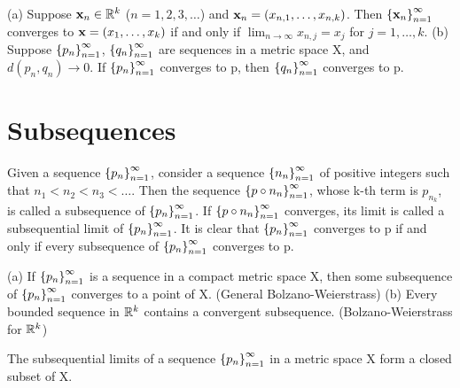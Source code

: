 \begin{theorem} %
  \label{thm:chap3:convergence_components}
  (a) Suppose $\mathbf{x}_n \in \mathbb{R}^k$ ($n=1, 2, 3, \dots$) and
  $\mathbf{x}_n = (x_{n,1}, \dots, x_{n,k})$. Then
  $\left\{ \mathbf{x}_n \right\}_{n=1}^\infty$ converges to $\mathbf{x} = (x_1, \dots, x_k)$
  if and only if $\lim_{n \to \infty} x_{n,j} = x_j$ for $j=1, \dots, k$.
  (b) Suppose $\left\{ p_n \right\}_{n=1}^\infty$, $\left\{ q_n \right\}_{n=1}^\infty$ are sequences in a
  metric space X, and $d(p_n, q_n) \to 0$. If $\left\{ p_n \right\}_{n=1}^\infty$
  converges to p, then $\left\{ q_n \right\}_{n=1}^\infty$ converges to p.
\end{theorem}

\section{Subsequences}
\label{sec:chap3:subsequences}

\begin{definition} %
  \label{def:chap3:subsequence_sublimit}
  Given a sequence $\left\{ p_n \right\}_{n=1}^\infty$, consider a sequence $\left\{ n_n \right\}_{n=1}^\infty$
  of positive integers such that $n_1 < n_2 < n_3 < \dots$. Then the
  sequence $\left\{ p \circ n_n \right\}_{n=1}^\infty$, whose k-th term is $p_{n_k}$, is
  called a subsequence of $\left\{ p_n \right\}_{n=1}^\infty$. If $\left\{ p \circ n_n \right\}_{n=1}^\infty$
  converges, its limit is called a subsequential limit of $\left\{ p_n \right\}_{n=1}^\infty$.
  It is clear that $\left\{ p_n \right\}_{n=1}^\infty$ converges to p if and only if every
  subsequence of $\left\{ p_n \right\}_{n=1}^\infty$ converges to p.
\end{definition}

\begin{theorem} %
  \label{thm:chap3:subsequence_props_bw}
  (a) If $\left\{ p_n \right\}_{n=1}^\infty$ is a sequence in a compact metric space X,
  then some subsequence of $\left\{ p_n \right\}_{n=1}^\infty$ converges to a point of X.
  (General Bolzano-Weierstrass)
  (b) Every bounded sequence in $\mathbb{R}^k$ contains a convergent
  subsequence. (Bolzano-Weierstrass for $\mathbb{R}^k$)
\end{theorem}



\begin{theorem} %
  \label{thm:chap3:sublimits_closed}
  The subsequential limits of a sequence $\left\{ p_n \right\}_{n=1}^\infty$ in a metric
  space X form a closed subset of X.
\end{theorem}

